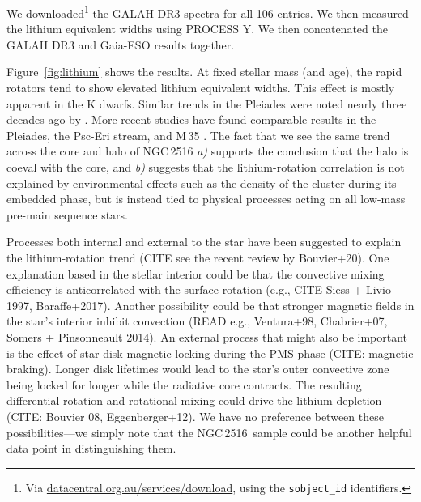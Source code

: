\documentclass[12pt,twocolumn,tighten]{aastex63}
\newcommand{\cn}{NGC\,2516} %
\begin{document}
We downloaded\footnote{Via \url{datacentral.org.au/services/download},
using the \texttt{sobject\_id} identifiers.}
the GALAH DR3 spectra for all 106 entries.
We then measured the lithium equivalent widths using PROCESS Y.
We then concatenated the GALAH DR3 and Gaia-ESO results together.

Figure~\ref{fig:lithium} shows the results.  At fixed stellar mass
(and age), the rapid rotators tend to show elevated lithium equivalent
widths. This effect is mostly apparent in the K dwarfs.  Similar
trends in the Pleiades were noted nearly three decades ago by
\citet{soderblom_evolution_1993}.  More recent studies have found
comparable results in the Pleiades, the Psc-Eri stream, and M\,35
\citep{bouvier_pleiades_lirot_2018,arancibia_2020,jeffries_m35_li_2020}.
The fact that we see the same trend across the core and halo of \cn
{\it a)} supports the conclusion that the halo is coeval with the
core, and {\it b)} suggests that the lithium-rotation correlation is
not explained by environmental effects such as the density of the cluster
during its embedded phase, but is instead tied to physical processes
acting on all low-mass pre-main sequence stars.

Processes both internal and external to the star have been suggested to explain
the lithium-rotation trend (CITE see the recent review by Bouvier+20).
One explanation based in the stellar interior could be that the
convective mixing efficiency is anticorrelated with the surface
rotation (e.g., CITE Siess + Livio 1997, Baraffe+2017).  Another
possibility could be that stronger magnetic fields in the star's
interior inhibit convection (READ e.g., Ventura+98, Chabrier+07,
Somers + Pinsonneault 2014).  An external process that might also be
important is the effect of star-disk magnetic locking during the PMS
phase (CITE: magnetic braking).  Longer disk lifetimes would lead to
the star's outer convective zone being locked for longer while the
radiative core contracts.  The resulting differential rotation and
rotational mixing could drive the lithium depletion (CITE: Bouvier 08,
Eggenberger+12).
We have no preference between these possibilities---we simply note
that the \cn\ sample could be another helpful data point in
distinguishing them.
\end{document}
